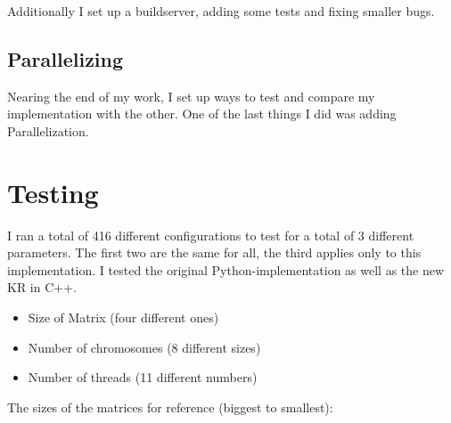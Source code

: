 Additionally I set up a buildserver, adding some tests and fixing smaller bugs.


\subsection{Parallelizing}


Nearing the end of my work, I set up ways to test and compare my implementation
with the other. One of the last things I did was adding Parallelization.



\section{Testing}\label{sec:testing}


I ran a total of 416 different configurations to test for a total of 3
different parameters. The first two are the same for all, the third applies
only to this implementation. I tested the original Python-implementation as
well as the new KR in C++.

\begin{itemize}
    \item Size of Matrix (four different ones)
    \item Number of chromosomes (8 different sizes)
    \item Number of threads (11 different numbers)
\end{itemize}


\newpage
The sizes of the matrices for reference (biggest to smallest):

